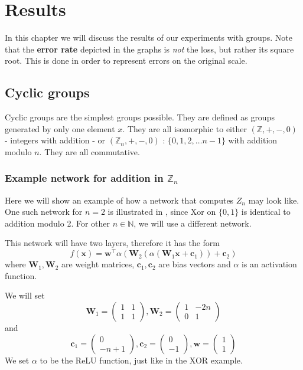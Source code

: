 \chapter{Results}
\label{chapter:results}
In this chapter we will discuss the results of our experiments with groups. Note that the \textbf{error rate} depicted in the graphs is \textit{not} the loss, but rather its square root. This is done in order to represent errors on the original scale.

\section{Cyclic groups}
Cyclic groups are the simplest groups possible. They are defined as groups generated by only one element $x$. They are all isomorphic to either $(\mathbb{Z},+,-,0)$ - integers with addition - or $(\mathbb{Z}_n,+,-,0)$ : $\{0,1,2,\dots n-1\}$ with addition modulo $n$. They are all commutative.

\subsection{Example network for addition in $\mathbb{Z}_n$}
\label{section:addition example}
Here we will show an example of how a network that computes $Z_n$ may look like. One such network for $n=2$ is illustrated in , since Xor on $\{0,1\}$ is identical to addition modulo 2. For other $n\in \mathbb{N}$, we will use a different network.

This network will have two layers, therefore it has the form $$f(\textbf{x})=\textbf{w}^\top \alpha\left(\textbf{W}_2(\alpha(\textbf{W}_1\textbf{x}+\textbf{c}_1))+\textbf{c}_2\right)$$ where $\textbf{W}_1,\textbf{W}_2$ are weight matrices, $\textbf{c}_1,\textbf{c}_2$ are bias vectors and $\alpha$ is an activation function.

We will set 
$$\textbf{W}_1=
	\left(\begin{matrix}
		1 & 1\\
		1 & 1
	\end{matrix}\right), 
\textbf{W}_2=
	\left(\begin{matrix}
		1 & -2n\\
		0 & 1
	\end{matrix}\right)$$
	and
$$\textbf{c}_1=
	\left(\begin{matrix}
		0\\
		-n+1
	\end{matrix}\right),
\textbf{c}_2=
	\left(\begin{matrix}
		0\\
		-1
	\end{matrix}\right),
\textbf{w}=
	\left(\begin{matrix}
		1 \\
		1
	\end{matrix}\right)$$
We set $\alpha$ to be the ReLU function, just like in the XOR example.

